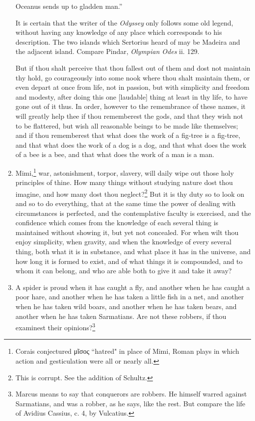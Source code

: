 \begin{enumerate}
{\begin{displayquote}
	Oceanus sends up to gladden man.''
\end{displayquote}
It is certain that the writer of the \textit{Odyssey} only follows some old legend, without having any knowledge of any place which corresponds to his description. The two islands which Sertorius heard of may be Madeira and the adjacent island. Compare Pindar, \textit{Olympian Odes} ii. 129.} But if thou shalt perceive that thou fallest out of them and dost not maintain thy hold, go courageously into some nook where thou shalt maintain them, or even depart at once from life, not in passion, but with simplicity and freedom and modesty, after doing this one [{\clarify laudable}] thing at least in thy life, to have gone out of it thus. In order, however to the remembrance of these names, it will greatly help thee if thou rememberest the gods, and that they wish not to be flattered, but wish all reasonable beings to be made like themselves; and if thou rememberest that what does the work of a fig-tree is a fig-tree, and that what does the work of a dog is a dog, and that what does the work of a bee is a bee, and that what does the work of a man is a man.

\item Mimi,\footnote{Corais conjectured \textgreek{μῖσος} ``hatred" in place of Mimi, Roman plays in which action and gesticulation were all or nearly all.} war, astonishment, torpor, slavery, will daily wipe out those holy principles of thine. How many things without studying nature dost thou imagine, and how many dost thou neglect?\footnote{This is corrupt. See the addition of Schultz.} But it is thy duty so to look on and so to do everything, that at the same time the power of dealing with circumstances is perfected, and the contemplative faculty is exercised, and the confidence which comes from the knowledge of each several thing is maintained without showing it, but yet not concealed. For when wilt thou enjoy simplicity, when gravity, and when the knowledge of every several thing, both what it is in substance, and what place it has in the universe, and how long it is formed to exist, and of what things it is compounded, and to whom it can belong, and who are able both to give it and take it away?

\item A spider is proud when it has caught a fly, and another when he has caught a poor hare, and another when he has taken a little fish in a net, and another when he has taken wild boars, and another when he has taken bears, and another when he has taken Sarmatians. Are not these robbers, if thou examinest their opinions?\footnote{Marcus means to say that conquerors are robbers. He himself warred against Sarmatians, and was a robber, as he says, like the rest. But compare the life of Avidius Cassius, c. 4, by Vulcatius.}


\end{enumerate}
